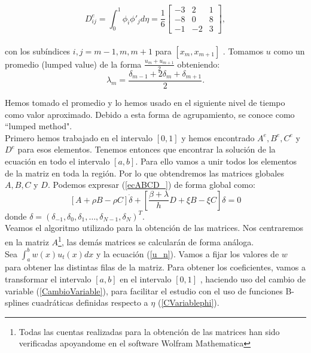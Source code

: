 \begin{equation}
D^{e}_{ij}=\int_{0}^{1}\phi_{i}\phi'_{j}  d\eta=\frac{1}{6}
\begin{bmatrix}
-3 & 2 & 1\\
-8 & 0 & 8\\
-1 & -2 & 3
\end{bmatrix},
\end{equation}\\

\noindent con los subíndices $i,j=m-1 , m , m+1$ para $[x_{m},x_{m+1}]$ . Tomamos $u$ como un promedio (lumped value) de la forma $\frac{u_{m}+u_{m+1}}{2}$ obteniendo:
$$\lambda_{m}=\frac{\delta_{m-1}+2\delta_{m}+\delta_{m+1}}{2}.$$

 Hemos tomado el promedio y lo hemos usado en el siguiente nivel de tiempo como valor aproximado. Debido a esta forma de agrupamiento, se conoce como ``lumped method".\\
 Primero hemos trabajado en el intervalo $[0,1]$ y hemos encontrado $A^{e}, B^{e} , C^{e}$  \mbox{y} $ D^{e}$ para esos elementos. Tenemos entonces que encontrar la solución de la ecuación en todo el intervalo $[a,b]$. Para ello vamos a unir todos los elementos de la matriz en toda la región. Por lo que obtendremos las matrices globales $A, B, C $ y $ D$. Podemos expresar (\ref{ecABCD_}) de forma global como:
\begin{equation}
\label{ecABCDLD}
    \left[ A+\rho B - \rho C \right]\dot{\delta}+\left[ \frac{\beta + \lambda}{h}D+\xi B-\xi C \right]\delta=0
\end{equation}
\noindent donde $\delta=(\delta_{-1},\delta_{0},\delta_{1},\dots,\delta_{N-1},\delta_{N})^{T}$.\\


Veamos el algoritmo utilizado para la obtención de las matrices. Nos centraremos en la matriz $A$\footnote{Todas las cuentas realizadas para la obtención de las matrices han sido verificadas apoyandome en el software Wolfram Mathematica}, las demás matrices se calcularán de forma análoga.\\

Sea $\displaystyle\int_{a}^{b}w(x) u_{t}(x)dx$ y la ecuación (\ref{u_n}). Vamos a fijar los valores de $w$ para obtener las distintas filas de la matriz. Para obtener los coeficientes, vamos a transformar el intervalo $[a,b]$ en el intervalo $[0,1]$ , haciendo uso del cambio de variable (\ref{CambioVariable}),  para facilitar el estudio con el uso de funciones B-splines cuadráticas definidas respecto a $\eta$ (\ref{CVariablephi}).

